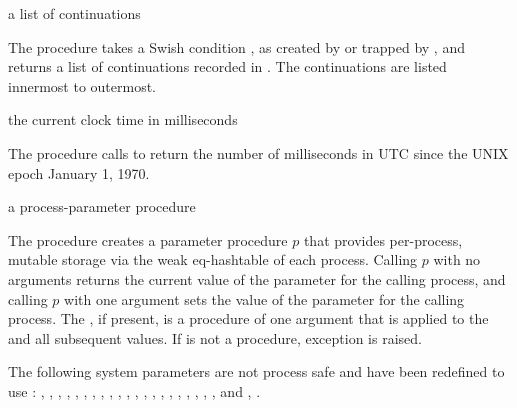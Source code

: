 \begin{procedure}
\end{procedure}
\returns{} a list of continuations

The  procedure takes a Swish condition ,
as created by  or trapped by ,
and returns a list of continuations recorded in .
The continuations are listed innermost to outermost.

\begin{procedure}
\end{procedure}
\returns{} the current clock time in milliseconds

The  procedure calls  to return
the number of milliseconds in UTC since the UNIX epoch January 1,
1970.

\begin{procedure}
\end{procedure}
\returns{} a process-parameter procedure

The  procedure creates a parameter
procedure $p$ that provides per-process, mutable storage via the
 weak eq-hashtable of each process. Calling $p$ with
no arguments returns the current value of the parameter for the
calling process, and calling $p$ with one argument sets the value of
the parameter for the calling process. The , if present,
is a procedure of one argument that is applied to the 
and all subsequent values. If  is not a procedure,
exception  is
raised.

The following system parameters are not process safe and have
been redefined to use :
,
,
,
,
,
,
,
,
,
,
,
,
,
,
,
,
,
,
,
,
, and
,
.

